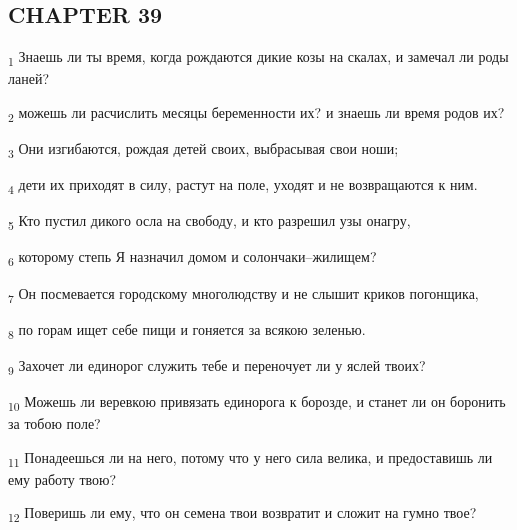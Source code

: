 \subsection{CHAPTER 39}
\begin{tcolorbox}
\textsubscript{1} Знаешь ли ты время, когда рождаются дикие козы на скалах, и замечал ли роды ланей?
\end{tcolorbox}
\begin{tcolorbox}
\textsubscript{2} можешь ли расчислить месяцы беременности их? и знаешь ли время родов их?
\end{tcolorbox}
\begin{tcolorbox}
\textsubscript{3} Они изгибаются, рождая детей своих, выбрасывая свои ноши;
\end{tcolorbox}
\begin{tcolorbox}
\textsubscript{4} дети их приходят в силу, растут на поле, уходят и не возвращаются к ним.
\end{tcolorbox}
\begin{tcolorbox}
\textsubscript{5} Кто пустил дикого осла на свободу, и кто разрешил узы онагру,
\end{tcolorbox}
\begin{tcolorbox}
\textsubscript{6} которому степь Я назначил домом и солончаки--жилищем?
\end{tcolorbox}
\begin{tcolorbox}
\textsubscript{7} Он посмевается городскому многолюдству и не слышит криков погонщика,
\end{tcolorbox}
\begin{tcolorbox}
\textsubscript{8} по горам ищет себе пищи и гоняется за всякою зеленью.
\end{tcolorbox}
\begin{tcolorbox}
\textsubscript{9} Захочет ли единорог служить тебе и переночует ли у яслей твоих?
\end{tcolorbox}
\begin{tcolorbox}
\textsubscript{10} Можешь ли веревкою привязать единорога к борозде, и станет ли он боронить за тобою поле?
\end{tcolorbox}
\begin{tcolorbox}
\textsubscript{11} Понадеешься ли на него, потому что у него сила велика, и предоставишь ли ему работу твою?
\end{tcolorbox}
\begin{tcolorbox}
\textsubscript{12} Поверишь ли ему, что он семена твои возвратит и сложит на гумно твое?
\end{tcolorbox}

